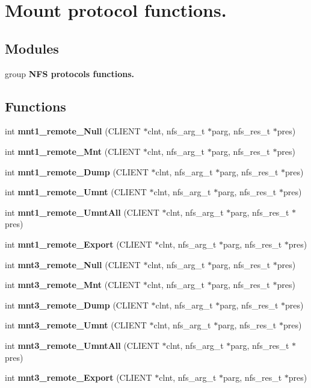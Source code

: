 \section{Mount protocol functions.}
\label{group__MNTprocs}
\subsection*{Modules}
\begin{CompactItemize}
\item 
group {\bf NFS protocols functions.}
\end{CompactItemize}
\subsection*{Functions}
\begin{CompactItemize}
\item 
int {\bf mnt1\_\-remote\_\-Null} (CLIENT $\ast$clnt, nfs\_\-arg\_\-t $\ast$parg, nfs\_\-res\_\-t $\ast$pres)
\item 
int {\bf mnt1\_\-remote\_\-Mnt} (CLIENT $\ast$clnt, nfs\_\-arg\_\-t $\ast$parg, nfs\_\-res\_\-t $\ast$pres)
\item 
int {\bf mnt1\_\-remote\_\-Dump} (CLIENT $\ast$clnt, nfs\_\-arg\_\-t $\ast$parg, nfs\_\-res\_\-t $\ast$pres)
\item 
int {\bf mnt1\_\-remote\_\-Umnt} (CLIENT $\ast$clnt, nfs\_\-arg\_\-t $\ast$parg, nfs\_\-res\_\-t $\ast$pres)
\item 
int {\bf mnt1\_\-remote\_\-Umnt\-All} (CLIENT $\ast$clnt, nfs\_\-arg\_\-t $\ast$parg, nfs\_\-res\_\-t $\ast$pres)
\item 
int {\bf mnt1\_\-remote\_\-Export} (CLIENT $\ast$clnt, nfs\_\-arg\_\-t $\ast$parg, nfs\_\-res\_\-t $\ast$pres)
\item 
int {\bf mnt3\_\-remote\_\-Null} (CLIENT $\ast$clnt, nfs\_\-arg\_\-t $\ast$parg, nfs\_\-res\_\-t $\ast$pres)
\item 
int {\bf mnt3\_\-remote\_\-Mnt} (CLIENT $\ast$clnt, nfs\_\-arg\_\-t $\ast$parg, nfs\_\-res\_\-t $\ast$pres)
\item 
int {\bf mnt3\_\-remote\_\-Dump} (CLIENT $\ast$clnt, nfs\_\-arg\_\-t $\ast$parg, nfs\_\-res\_\-t $\ast$pres)
\item 
int {\bf mnt3\_\-remote\_\-Umnt} (CLIENT $\ast$clnt, nfs\_\-arg\_\-t $\ast$parg, nfs\_\-res\_\-t $\ast$pres)
\item 
int {\bf mnt3\_\-remote\_\-Umnt\-All} (CLIENT $\ast$clnt, nfs\_\-arg\_\-t $\ast$parg, nfs\_\-res\_\-t $\ast$pres)
\item 
int {\bf mnt3\_\-remote\_\-Export} (CLIENT $\ast$clnt, nfs\_\-arg\_\-t $\ast$parg, nfs\_\-res\_\-t $\ast$pres)
\end{CompactItemize}



